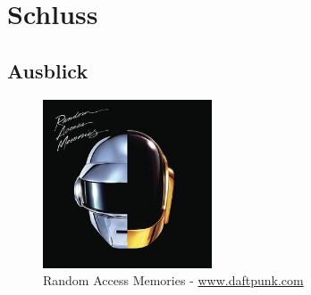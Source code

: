 \chapter{Schluss}
\label{sec:schluss}

\blindtext

\section{Ausblick}
\label{sec:ausblick}

\blindtext

\begin{figure}[H]
    \begin{center}
        \includegraphics[width=5cm]{assets/figure.jpg}
        \caption[Random Access Memories]{Random Access Memories - \url{www.daftpunk.com}}
        \label{ram_cover}
    \end{center}
\end{figure}